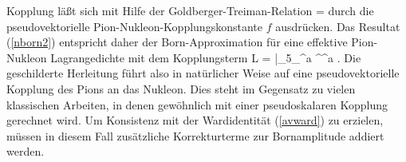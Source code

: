 Kopplung l\"a\ss t sich mit Hilfe der Goldberger-Treiman-Relation
\be
\label{GT}
 = 
\ee
durch die pseudovektorielle Pion-Nukleon-Kopplungskonstante $f$ ausdr\"ucken.
Das Resultat (\ref{nborn2}) entspricht daher der Born-Approximation f\"ur
eine effektive Pion-Nukleon Lagrangedichte mit dem Kopplungsterm
\be
\label{pv}
{\cal L} =  \bar{\psi}\gamma_5\gamma_\mu \tau^{a}\psi
   \partial^\mu \phi^{a}\; .
\ee    
Die geschilderte Herleitung f\"uhrt also in nat\"urlicher Weise
auf eine pseudovektorielle Kopplung des Pions an das Nukleon. Dies 
steht im Gegensatz zu vielen klassischen Arbeiten, in denen 
gew\"ohnlich mit einer pseudoskalaren Kopplung gerechnet wird.
Um Konsistenz mit der Wardidentit\"at (\ref{avward}) zu erzielen,
m\"ussen in diesem Fall zus\"atzliche Korrekturterme zur Bornamplitude
addiert werden.

